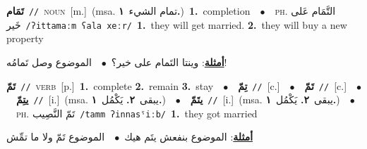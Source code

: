 \documentclass[10pt,a4paper,twoside]{article} %
\begin{document}
\begin{multicols}{2}
{\setlength\topsep{0pt}\textbf{\foreignlanguage{arabic}{تَمَام}}\ {\color{gray}\texttt{//}\color{black}}\ \textsc{noun}\ [m.]\ \color{gray}(msa. \foreignlanguage{arabic}{تمام الشيء}~\foreignlanguage{arabic}{\textbf{١.}})\color{black}\ \textbf{1.}~completion\ \ $\bullet$\ \ \textsc{ph.} \color{gray} \foreignlanguage{arabic}{التَّمَام عَلى خَير}\color{black}\ {\color{gray}\texttt{/{\sffamily ʔittamaːm ʕala xeːr}/}\color{black}}\ \textbf{1.}~they will get married.  \textbf{2.}~they will buy a new property\  \begin{flushright}\color{gray}\foreignlanguage{arabic}{\textbf{\underline{\foreignlanguage{arabic}{أمثلة}}}: وينتا التَمام على خير؟\ $\bullet$\ \  الموضوع وصل تَمامُه!}\end{flushright}\color{black}} \vspace{2mm}

{\setlength\topsep{0pt}\textbf{\foreignlanguage{arabic}{تَمّ}}\ {\color{gray}\texttt{//}\color{black}}\ \textsc{verb}\ [p.]\ \textbf{1.}~complete  \textbf{2.}~remain  \textbf{3.}~stay\ \ $\bullet$\ \ \setlength\topsep{0pt}\textbf{\foreignlanguage{arabic}{تِمّ}}\ {\color{gray}\texttt{//}\color{black}}\ [c.]\ \ $\bullet$\ \ \setlength\topsep{0pt}\textbf{\foreignlanguage{arabic}{تَمّ}}\ {\color{gray}\texttt{//}\color{black}}\ [c.]\ \ $\bullet$\ \ \setlength\topsep{0pt}\textbf{\foreignlanguage{arabic}{يتِمّ}}\ {\color{gray}\texttt{//}\color{black}}\ [i.]\ \color{gray}(msa. \foreignlanguage{arabic}{يبقى}~\foreignlanguage{arabic}{\textbf{٢.}}  \foreignlanguage{arabic}{يَكْمُل}~\foreignlanguage{arabic}{\textbf{١.}})\color{black}\ \ $\bullet$\ \ \setlength\topsep{0pt}\textbf{\foreignlanguage{arabic}{يتَمّ}}\ {\color{gray}\texttt{//}\color{black}}\ [i.]\ \color{gray}(msa. \foreignlanguage{arabic}{يبقى}~\foreignlanguage{arabic}{\textbf{٢.}}  \foreignlanguage{arabic}{يَكْمُل}~\foreignlanguage{arabic}{\textbf{١.}})\color{black}\ \ $\bullet$\ \ \textsc{ph.} \color{gray} \foreignlanguage{arabic}{تَمّ النَّصِيب}\color{black}\ {\color{gray}\texttt{/{\sffamily tamm ʔinnasˤiːb}/}\color{black}}\ \textbf{1.}~they got married\  \begin{flushright}\color{gray}\foreignlanguage{arabic}{\textbf{\underline{\foreignlanguage{arabic}{أمثلة}}}: الموضوع بنفعش يتَم هيك\ $\bullet$\ \  الموضوع تَمّ ولا ما تمِّش}\end{flushright}\color{black}} \vspace{2mm}


\end{multicols}
\end{document}
